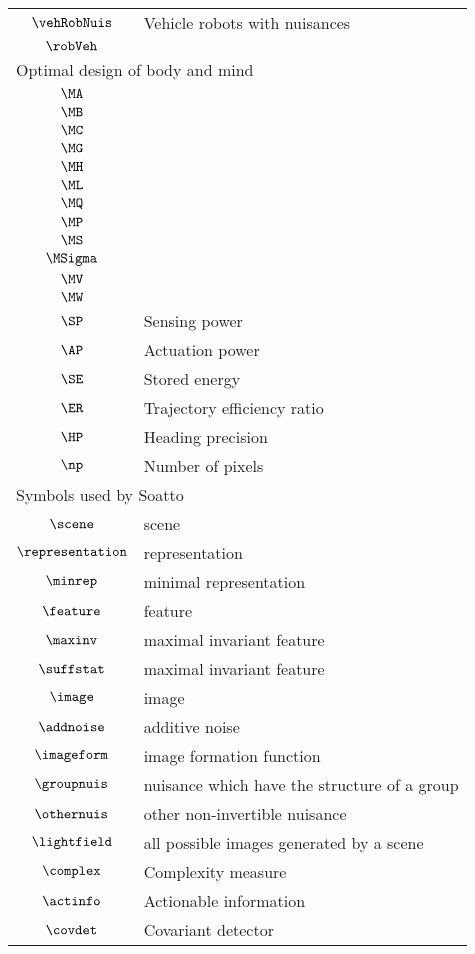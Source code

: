 \begin{longtable}{cl}
 $\vehRobNuis$ &  Vehicle robots with nuisances\\ 
 $\robVeh$ & \\ 
 \multicolumn{2}{l}{Optimal design of body and mind}\\ 
 \hline
$\MA$ & \\ 
 $\MB$ & \\ 
 $\MC$ & \\ 
 $\MG$ & \\ 
 $\MH$ & \\ 
 $\ML$ & \\ 
 $\MQ$ & \\ 
 $\MP$ & \\ 
 $\MS$ & \\ 
 $\MSigma$ & \\ 
 $\MV$ & \\ 
 $\MW$ & \\ 
 $\SP$ &  Sensing power\\ 
 $\AP$ &  Actuation power\\ 
 $\SE$ &  Stored energy\\ 
 $\ER$ &  Trajectory efficiency ratio\\ 
 $\HP$ &  Heading precision\\ 
 $\np$ &  Number of pixels\\ 
 \multicolumn{2}{l}{Symbols used by Soatto}\\ 
 \hline
$\scene$ &  scene\\ 
 $\representation$ &  representation\\ 
 $\minrep$ &  minimal representation\\ 
 $\feature$ &  feature\\ 
 $\maxinv$ &  maximal invariant feature\\ 
 $\suffstat$ &  maximal invariant feature\\ 
 $\image$ &  image\\ 
 $\addnoise$ &  additive noise\\ 
 $\imageform$ &  image formation function\\ 
 $\groupnuis$ &  nuisance which have the structure of a group\\ 
 $\othernuis$ &  other non-invertible nuisance\\ 
 $\lightfield$ &  all possible images generated by a scene\\ 
 $\complex$ &  Complexity measure\\ 
 $\actinfo$ &  Actionable information\\ 
 $\covdet$ &  Covariant detector\\ 

\end{longtable}
